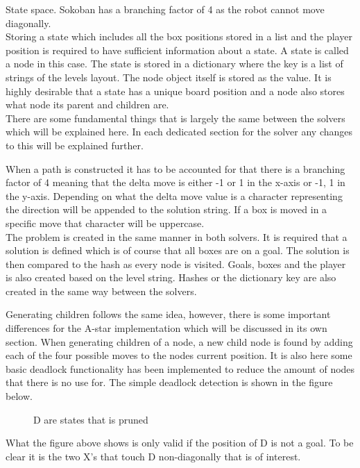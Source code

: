 \documentclass[../../main.tex]{subfiles}
\begin{document}
State space.
Sokoban has a branching factor of 4 as the robot cannot move diagonally. \\	

Storing a state which includes all the box positions stored in a list and the player position is required to have 				sufficient 	information about a state. A state is called a node in this case. The state is stored in a dictionary where 		the key is a list of strings of the levels layout. The node object itself is stored as the value. It is highly desirable that a 	state has a unique board position and a node also stores what node its parent and children are. \\

There are some fundamental things that is largely the same between the solvers which will be explained here. In each dedicated section for the solver any changes to this will be explained further.

When a path is constructed it has to be accounted for that there is a branching factor of 4 meaning that the delta move is either -1 or 1 in the x-axis or -1, 1 in the y-axis. Depending on what the delta move value is a character representing the direction will be appended to the solution string. If a box is moved in a specific move that character will be uppercase. \\

The problem is created in the same manner in both solvers. It is required that a solution is defined which is of course that all boxes are on a goal. The solution is then compared to the hash as every node is visited. Goals, boxes and the player is also created based on the level string. Hashes or the dictionary key are also created in the same way between the solvers. 

Generating children follows the same idea, however, there is some important differences for the A-star implementation which will be discussed in its own section. When generating children of a node, a new child node is found by adding each of the four possible moves to the nodes current position. It is also here some basic deadlock functionality has been implemented to reduce the amount of nodes that there is no use for. The simple deadlock detection is shown in the figure below.

\begin{figure}[h]
	\centering

	\caption{D are states that is pruned}
	\label{fig:basic_deadlock_detection}
\end{figure}

What the figure above shows is only valid if the position of D is not a goal. To be clear it is the two X's that touch D non-diagonally that is of interest.
\end{document}
